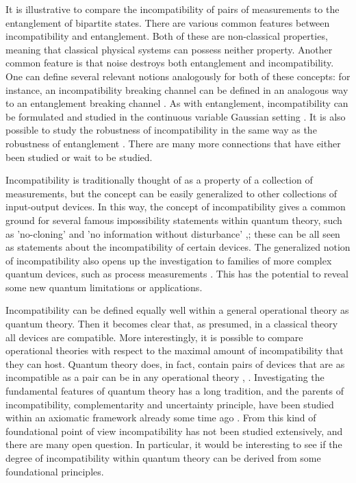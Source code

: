 \documentclass[12pt]{article}
\theoremstyle{definition}
\begin{document}
It is illustrative to compare the incompatibility of pairs of measurements to the entanglement of bipartite states. 
There are various common features between incompatibility and entanglement. 
Both of these are non-classical properties, meaning that classical physical systems can possess neither property. 
Another common feature is that noise destroys both entanglement and incompatibility.
One can define several relevant notions analogously for both of these concepts:
for instance, an incompatibility breaking channel can be defined in an analogous way to an entanglement breaking channel \cite{HeKiReSc15}.
As with entanglement, incompatibility can be formulated and studied in the continuous variable Gaussian setting \cite{HeKiSc15}.
It is also possible to study the robustness of incompatibility in the same way as the robustness of entanglement \cite{Haapasalo15}.
There are many more connections that have either been studied or wait to be studied.
 
Incompatibility is traditionally thought of as a property of a collection of measurements, but the concept can be easily generalized to other collections of input-output devices. 
In this way, the concept of incompatibility gives a common ground for several famous impossibility statements within quantum theory, such as 'no-cloning' \cite{ScIbGiAc05} and 'no information without disturbance' \cite{Busch09},\cite{QI01Werner}; these can be all seen as statements about the incompatibility of certain devices. 
The generalized notion of incompatibility also opens up the investigation to families of more complex quantum devices, such as process measurements \cite{SeReChZi15}. 
This has the potential to reveal some new quantum limitations or applications.

Incompatibility can be defined equally well within a general operational theory as quantum theory.
Then it becomes clear that, as presumed, in a classical theory all devices are compatible.
More interestingly, it is possible to compare operational theories with respect to the maximal amount of incompatibility that they can host. 
Quantum theory does, in fact, contain pairs of devices that are as incompatible as a pair can be in any operational theory \cite{BuHeScSt13}, \cite{HeScToZi14}.
Investigating the fundamental features of quantum theory has a long tradition, and the parents of incompatibility, complementarity and uncertainty principle, have been studied within an axiomatic framework already some time ago \cite{BuLa80}.  
From this kind of foundational point of view incompatibility has not been  studied extensively, and there are many open question.
In particular, it would be interesting to see if the degree of incompatibility within quantum theory can be derived from some foundational principles. 
\end{document}
